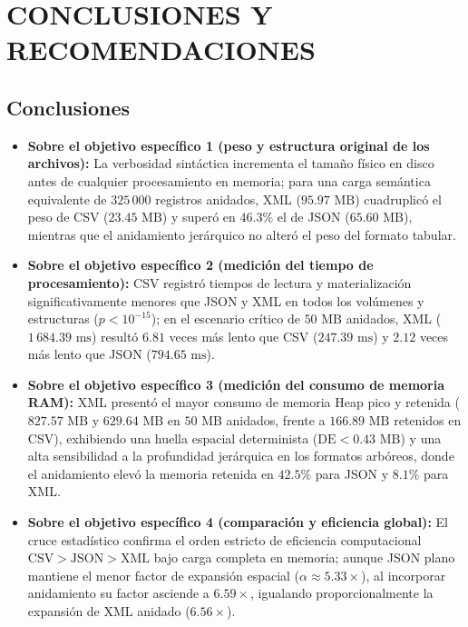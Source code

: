 \section{CONCLUSIONES Y RECOMENDACIONES}

\subsection{Conclusiones}

\begin{itemize}
    \item \textbf{Sobre el objetivo específico 1 (peso y estructura original de los archivos):} La verbosidad sintáctica incrementa el tamaño físico en disco antes de cualquier procesamiento en memoria; para una carga semántica equivalente de $325\,000$ registros anidados, XML ($95.97\text{ MB}$) cuadruplicó el peso de CSV ($23.45\text{ MB}$) y superó en $46.3\%$ el de JSON ($65.60\text{ MB}$), mientras que el anidamiento jerárquico no alteró el peso del formato tabular.

    \item \textbf{Sobre el objetivo específico 2 (medición del tiempo de procesamiento):} CSV registró tiempos de lectura y materialización significativamente menores que JSON y XML en todos los volúmenes y estructuras ($p < 10^{-15}$); en el escenario crítico de $50\text{ MB}$ anidados, XML ($1\,684.39\text{ ms}$) resultó $6.81$ veces más lento que CSV ($247.39\text{ ms}$) y $2.12$ veces más lento que JSON ($794.65\text{ ms}$).

    \item \textbf{Sobre el objetivo específico 3 (medición del consumo de memoria RAM):} XML presentó el mayor consumo de memoria Heap pico y retenida ($827.57\text{ MB}$ y $629.64\text{ MB}$ en $50\text{ MB}$ anidados, frente a $166.89\text{ MB}$ retenidos en CSV), exhibiendo una huella espacial determinista ($\text{DE} < 0.43\text{ MB}$) y una alta sensibilidad a la profundidad jerárquica en los formatos arbóreos, donde el anidamiento elevó la memoria retenida en $42.5\%$ para JSON y $8.1\%$ para XML.

    \item \textbf{Sobre el objetivo específico 4 (comparación y eficiencia global):} El cruce estadístico confirma el orden estricto de eficiencia computacional $\text{CSV} > \text{JSON} > \text{XML}$ bajo carga completa en memoria; aunque JSON plano mantiene el menor factor de expansión espacial ($\alpha \approx 5.33\times$), al incorporar anidamiento su factor asciende a $6.59\times$, igualando proporcionalmente la expansión de XML anidado ($6.56\times$).


\end{itemize}
